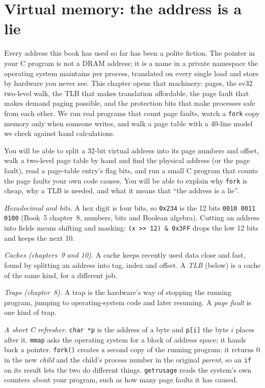 \chapter{Virtual memory: the address is a lie}
\label{ch:systems11}

Every address this book has used so far has been a polite fiction.
The pointer in your C program is not a DRAM address; it is a name in
a private namespace the operating system maintains per process, translated on
every single load and store by hardware you never see. This chapter
opens that machinery: pages, the sv32 two-level walk, the TLB that
makes translation affordable, the page fault that makes demand
paging possible, and the protection bits that make processes safe
from each other. We run real programs that count page faults, watch a
\texttt{fork} copy memory only when someone writes, and walk a page
table with a 40-line model we check against hand calculations.

\begin{rulebox}
You will be able to split a 32-bit virtual address into its page
numbers and offset, walk a two-level page table by hand and find the
physical address (or the page fault), read a page-table entry's flag
bits, and run a small C program that counts the page faults your own
code causes. You will be able to explain why \texttt{fork} is cheap,
why a TLB is needed, and what it means that ``the address is a lie''.
\end{rulebox}

\begin{rulebox}
\emph{Hexadecimal and bits.} A hex digit is four bits, so
\texttt{0x234} is the 12 bits \texttt{0010 0011 0100} (Book~5 chapter~8,
numbers, bits and Boolean algebra). Cutting an address into fields means
shifting and masking: \texttt{(x >> 12) \& 0x3FF} drops the low 12 bits
and keeps the next 10.

\emph{Caches (chapters~9 and 10).} A cache keeps recently used data close
and fast, found by splitting an address into tag, index and offset. A
\emph{TLB} (below) is a cache of the same kind, for a different job.

\emph{Traps (chapter~8).} A trap is the hardware's way of stopping the
running program, jumping to operating-system code and later resuming. A
\emph{page fault} is one kind of trap.

\emph{A short C refresher.} \texttt{char *p} is the address of a byte and
\texttt{p[i]} the byte \(i\) places after it. \texttt{mmap} asks the
operating system for a block of address space; it hands back a pointer.
\texttt{fork()} creates a second copy of the running program: it returns
0 in the new \emph{child} and the child's process number in the original
\emph{parent}, so an \texttt{if} on its result lets the two do different
things. \texttt{getrusage} reads the system's own counters about your
program, such as how many page faults it has caused.
\end{rulebox}

